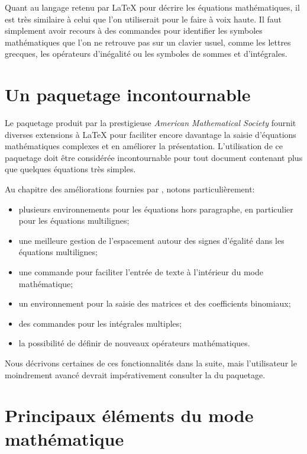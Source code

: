 Quant au langage retenu par {\LaTeX} pour décrire les équations
mathématiques, il est très similaire à celui que l'on utiliserait pour
le faire à voix haute. Il faut simplement avoir
recours à des commandes pour identifier les symboles mathématiques que
l'on ne retrouve pas sur un clavier usuel, comme les lettres grecques,
les opérateurs d'inégalité ou les symboles de sommes et d'intégrales.


\section{Un paquetage incontournable}
\label{sec:math:amsmath}

Le paquetage  \citep{amsmath} produit par la prestigieuse
\emph{American Mathematical Society} fournit diverses extensions à
{\LaTeX} pour faciliter encore davantage la saisie d'équations
mathématiques complexes et en améliorer la présentation. L'utilisation
de ce paquetage doit être considérée incontournable pour tout document
contenant plus que quelques équations très simples.

Au chapitre des améliorations fournies par , notons
particulièrement:
\begin{itemize}
\item plusieurs environnements pour les équations hors paragraphe, en
  particulier pour les équations multilignes;
\item une meilleure gestion de l'espacement autour des signes
  d'égalité dans les équations multilignes;
\item une commande pour faciliter l'entrée de texte à l'intérieur du
  mode mathématique;
\item un environnement pour la saisie des matrices et des coefficients
  binomiaux;
\item des commandes pour les intégrales multiples;
\item la possibilité de définir de nouveaux opérateurs mathématiques.
\end{itemize}
Nous décrivons certaines de ces fonctionnalités dans la suite, mais
l'utilisateur le moindrement avancé devrait impérativement consulter
la %
du paquetage.


\section{Principaux éléments du mode mathématique}
\label{sec:math:bases}

